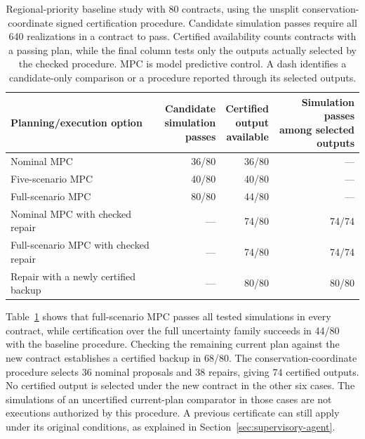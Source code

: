 \begin{table}[!htbp]
\centering\small
\setlength{\belowcaptionskip}{6pt}
\caption{Regional-priority baseline study with 80 contracts, using the unsplit
conservation-coordinate signed certification procedure. Candidate simulation
passes require all 640 realizations in a contract to pass. Certified
availability counts contracts with a passing plan, while the final column
tests only the outputs actually selected by the checked procedure.
MPC is model predictive control. A dash identifies a candidate-only
comparison or a procedure reported through its selected outputs.}
\label{tab:benchmark-deadlines}
\footnotesize
\setlength{\tabcolsep}{4pt}
\begin{tabularx}{\linewidth}{@{}Xrrr@{}}
\toprule
Planning/execution option & \shortstack{Candidate\\simulation\\passes} &
\shortstack{Certified\\output\\available} &
\shortstack{Simulation passes\\among selected\\outputs}\\
\midrule
Nominal MPC & 36/80 & 36/80 & ---\\
Five-scenario MPC & 40/80 & 40/80 & ---\\
Full-scenario MPC & 80/80 & 44/80 & ---\\
\midrule
Nominal MPC with checked repair & --- & 74/80 & 74/74\\
Full-scenario MPC with checked repair & --- & 74/80 & 74/74\\
Repair with a newly certified backup & --- & 80/80 & 80/80\\
\bottomrule
\end{tabularx}
\end{table}

Table~\ref{tab:benchmark-deadlines} shows that full-scenario MPC passes
all tested simulations in every contract, while certification over the full
uncertainty family succeeds in 44/80 with the baseline procedure. Checking the remaining current plan against the new
contract establishes a certified backup in 68/80. The conservation-coordinate procedure
selects 36 nominal proposals and 38 repairs, giving 74 certified outputs.
No certified output is selected under the new contract in the other six
cases. The simulations of an uncertified current-plan comparator in those
cases are not executions authorized by this procedure. A previous
certificate can still apply under its original conditions, as explained
in Section~\ref{sec:supervisory-agent}.

